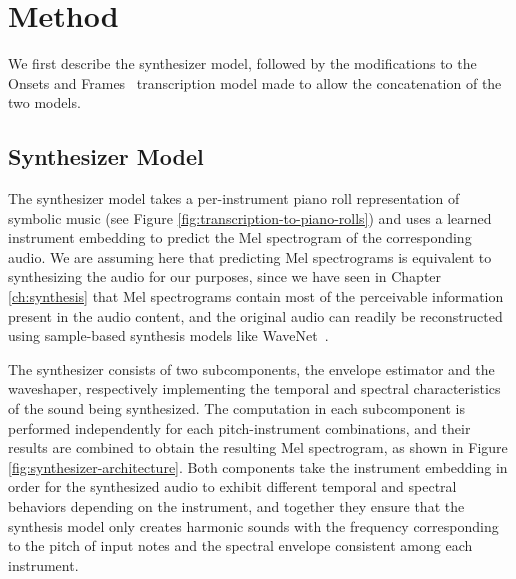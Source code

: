 \section{Method}

We first describe the synthesizer model, followed by the modifications to the Onsets and Frames~\cite{hawthorne2018onsetsframes} transcription model made to allow the concatenation of the two models.

\subsection{Synthesizer Model}

The synthesizer model takes a per-instrument piano roll representation of symbolic music (see Figure \ref{fig:transcription-to-piano-rolls}) and uses a learned instrument embedding to predict the Mel spectrogram of the corresponding audio.
We are assuming here that predicting Mel spectrograms is equivalent to synthesizing the audio for our purposes, since we have seen in Chapter \ref{ch:synthesis} that Mel spectrograms contain most of the perceivable information present in the audio content, and the original audio can readily be reconstructed using sample-based synthesis models like WaveNet~\cite{oord2016wavenet}.

The synthesizer consists of two subcomponents, the envelope estimator and the waveshaper, respectively implementing the temporal and spectral characteristics of the sound being synthesized.
The computation in each subcomponent is performed independently for each pitch-instrument combinations, and their results are combined to obtain the resulting Mel spectrogram, as shown in Figure \ref{fig:synthesizer-architecture}.
Both components take the instrument embedding in order for the synthesized audio to exhibit different temporal and spectral behaviors depending on the instrument, and together they ensure that the synthesis model only creates harmonic sounds with the frequency corresponding to the pitch of input notes and the spectral envelope consistent among each instrument.

